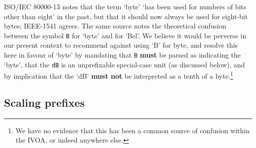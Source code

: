 \documentclass[11pt,a4paper]{ivoa}
\newcommand{\unit}[1]{\texttt{\small\color{orange}#1}}
\newcommand*\norm[1]{\textbf{\color{ivoacolor}#1}}
\begin{document}
ISO/IEC 80000-13 \citep[item 13-9.c]{std:iec80000-13} notes that the term `byte'
`has been used for numbers of bits other than eight' in the past, but
that it should now always be used for eight-bit bytes; IEEE-1541
\citep{std:ieee1541-2021} agrees.  The same source notes the theoretical
confusion between the symbol \unit{B} for `byte' and for `Bel'.  We
believe it would be perverse in our present context to recommend
against using `B' for byte, and resolve this here
in favour of `byte' by mandating that \unit{B} \norm{must} be parsed
as indicating the `byte', that the \unit{dB} is an
unprefixable special-case unit (as discussed below), and by
implication that the `dB'
\norm{must not} be interpreted as a tenth of a byte.\footnote{We have no
evidence that this has been a common source of confusion within the
IVOA, or indeed anywhere else.}

\subsection{Scaling prefixes\label{sec:scalingprefixes}}
\end{document}
